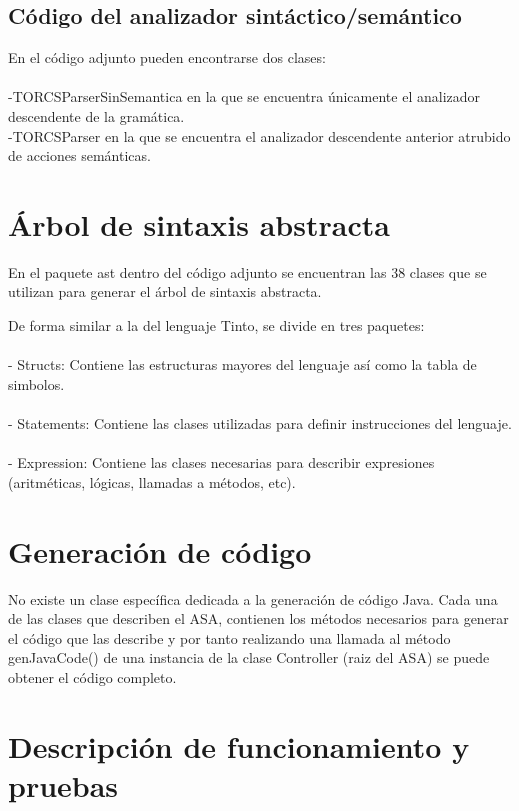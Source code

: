 \documentclass[11pt]{article}
\begin{document}
\subsection{Código del analizador sintáctico/semántico}

En el código adjunto pueden encontrarse dos clases:
\\ \\
-TORCSParserSinSemantica en la que se encuentra únicamente el analizador descendente de la gramática.
\\
-TORCSParser en la que se encuentra el analizador descendente anterior atrubido de acciones semánticas.

\section{Árbol de sintaxis abstracta}

En el paquete ast dentro del código adjunto se encuentran las 38 clases que se utilizan para generar el árbol de sintaxis abstracta.

De forma similar a la del lenguaje Tinto, se divide en tres paquetes:
\\ \\
- Structs: Contiene las estructuras mayores del lenguaje así como la tabla de simbolos.
\\ \\
- Statements: Contiene las clases utilizadas para definir instrucciones del lenguaje.
\\ \\
- Expression: Contiene las clases necesarias para describir expresiones (aritméticas, lógicas, llamadas a métodos, etc).

\section{Generación de código}

No existe un clase específica dedicada a la generación de código Java. Cada una de las clases que describen el ASA, contienen
los métodos necesarios para generar el código que las describe y por tanto realizando una llamada al método genJavaCode() de
una instancia de la clase Controller (raiz del ASA) se puede obtener el código completo.

\section{Descripción de funcionamiento y pruebas}
\end{document}

